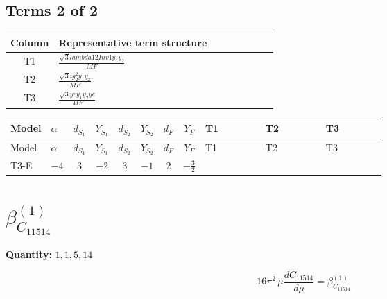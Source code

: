 \documentclass[8pt]{article}
\begin{document}
\begin{landscape}
\subsection*{Terms 2 of 2}
\begin{center}
\begin{tabular}{@{}c >{\raggedright\arraybackslash}p{0.82\linewidth}@{}}
\toprule
Column & Representative term structure \\
\midrule
T1 & \(\displaystyle \frac{\sqrt{3} lambda12Inv1 \overline{y_{1}} \overline{y_{2}}}{MF}\) \\
\midrule
T2 & \(\displaystyle \frac{\sqrt{3} i g_{2}^{2} \overline{y_{1}} \overline{y_{2}}}{MF}\) \\
\midrule
T3 & \(\displaystyle \frac{\sqrt{3} ye \overline{y_{1}} \overline{y_{2}} \overline{ye}}{MF}\) \\
\midrule
\bottomrule
\end{tabular}
\end{center}
\smallskip
\tiny
\begin{longtable}{@{}llcccccc >{\raggedright\arraybackslash}p{0.21\linewidth} >{\raggedright\arraybackslash}p{0.21\linewidth} >{\raggedright\arraybackslash}p{0.21\linewidth}@{}}
\toprule
Model & $\alpha$ & $d_{S_1}$ & $Y_{S_1}$ & $d_{S_2}$ & $Y_{S_2}$ & $d_F$ & $Y_F$ & T1 & T2 & T3 \\
\midrule
\endfirsthead
\toprule
Model & $\alpha$ & $d_{S_1}$ & $Y_{S_1}$ & $d_{S_2}$ & $Y_{S_2}$ & $d_F$ & $Y_F$ & T1 & T2 & T3 \\
\midrule
\endhead
T3-E & $-4$ & $3$ & $-2$ & $3$ & $-1$ & $2$ & $-\frac{3}{2}$ & \scriptsize\adjustbox{max width=\linewidth}{$\begin{gathered} \frac{\sqrt{3} lambda12Inv1 \overline{y_{1}} \overline{y_{2}}}{6 MF}\end{gathered}$} & \scriptsize\adjustbox{max width=\linewidth}{$\begin{gathered} - \frac{\sqrt{3} i g_{2}^{2} \overline{y_{1}} \overline{y_{2}}}{6 MF}\end{gathered}$} & \scriptsize\adjustbox{max width=\linewidth}{$\begin{gathered} \frac{\sqrt{3} ye \overline{y_{1}} \overline{y_{2}} \overline{ye}}{12 MF}\end{gathered}$} \\
\midrule
\bottomrule
\end{longtable}
\clearpage
\section*{$\beta_{C_{11514}}^{(1)}$}
\noindent\textbf{Quantity: }$\mathrm{1,1,5,14}$\par\smallskip
\[16\pi^2\,\mu\frac{d C_{11514}}{d\mu}=\beta_{C_{11514}}^{(1)}\]

\end{landscape}
\end{document}
